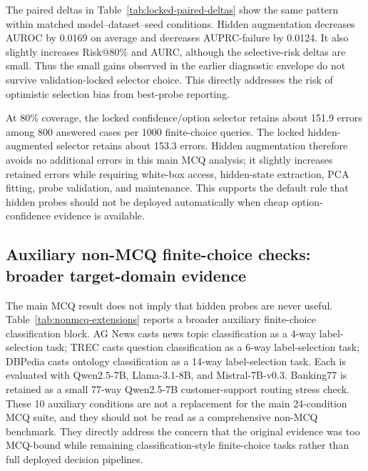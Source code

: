 \documentclass[preprint,12pt,authoryear]{elsarticle}
\begin{document}


The paired deltas in Table~\ref{tab:locked-paired-deltas} show the same pattern within matched model--dataset--seed conditions. Hidden augmentation decreases AUROC by 0.0169 on average and decreases AUPRC-failure by 0.0124. It also slightly increases Risk@80\% and AURC, although the selective-risk deltas are small. Thus the small gains observed in the earlier diagnostic envelope do not survive validation-locked selector choice. This directly addresses the risk of optimistic selection bias from best-probe reporting.








At 80\% coverage, the locked confidence/option selector retains about 151.9 errors among 800 answered cases per 1000 finite-choice queries. The locked hidden-augmented selector retains about 153.3 errors. Hidden augmentation therefore avoids no additional errors in this main MCQ analysis; it slightly increases retained errors while requiring white-box access, hidden-state extraction, PCA fitting, probe validation, and maintenance. This supports the default rule that hidden probes should not be deployed automatically when cheap option-confidence evidence is available.


\subsection{Auxiliary non-MCQ finite-choice checks: broader target-domain evidence}
\label{sec:nonmcq-extensions}
The main MCQ result does not imply that hidden probes are never useful. Table~\ref{tab:nonmcq-extensions} reports a broader auxiliary finite-choice classification block. AG News casts news topic classification as a 4-way label-selection task; TREC casts question classification as a 6-way label-selection task; DBPedia casts ontology classification as a 14-way label-selection task. Each is evaluated with Qwen2.5-7B, Llama-3.1-8B, and Mistral-7B-v0.3. Banking77 is retained as a small 77-way Qwen2.5-7B customer-support routing stress check. These 10 auxiliary conditions are not a replacement for the main 24-condition MCQ suite, and they should not be read as a comprehensive non-MCQ benchmark. They directly address the concern that the original evidence was too MCQ-bound while remaining classification-style finite-choice tasks rather than full deployed decision pipelines.
\end{document}
